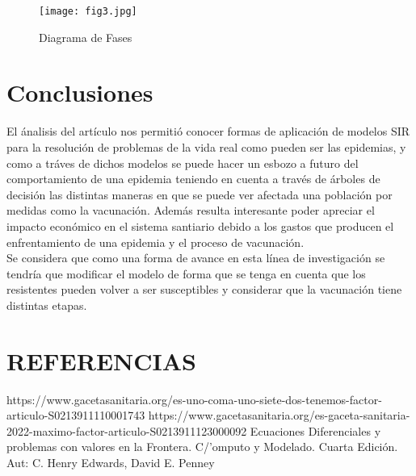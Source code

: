 \documentclass{wscpaperproc}
\theoremstyle{wsc}
\begin{document}
\begin{figure}%
	\texttt{[image: fig3.jpg]}
	\caption{Diagrama de Fases }
\end{figure}


\clearpage
\section*{Conclusiones}
El ánalisis del artículo nos permitió conocer formas de aplicación de modelos SIR para la resolución
de problemas de la vida real como pueden ser las epidemias, y como a tr\'aves de dichos modelos
se puede hacer un esbozo a futuro del comportamiento de una epidemia teniendo en cuenta
a trav\'es de \'arboles de decisi\'on las distintas maneras en que se puede ver afectada una 
poblaci\'on por medidas como la vacunaci\'on. Adem\'as resulta interesante
poder apreciar el impacto econ\'omico en el sistema santiario debido a los gastos que producen el enfrentamiento
de una epidemia y el proceso de vacunaci\'on.\\
Se considera que como una forma de avance en esta l\'inea de investigaci\'on se tendr\'ia que modificar el modelo
de forma que se tenga en cuenta que los resistentes pueden volver a ser susceptibles y considerar que la vacunaci\'on 
tiene distintas etapas.

\section*{REFERENCIAS}
https://www.gacetasanitaria.org/es-uno-coma-uno-siete-dos-tenemos-factor-articulo-S0213911110001743
https://www.gacetasanitaria.org/es-gaceta-sanitaria-2022-maximo-factor-articulo-S0213911123000092
Ecuaciones Diferenciales y problemas con valores en la Frontera. C/'omputo y Modelado. Cuarta Edición. Aut: C. Henry Edwards, David E. Penney

\appendix

\clearpage
\end{document}
